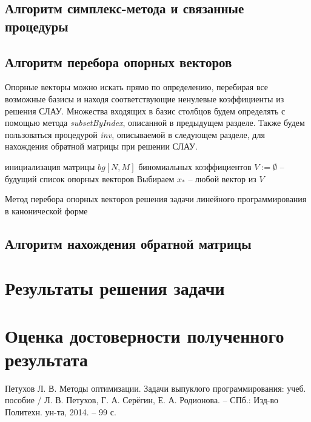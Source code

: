 \documentclass[main.tex]{subfiles}
\begin{document}
\subsection{Алгоритм симплекс-метода и связанные процедуры}

\subsection{Алгоритм перебора опорных векторов}
Опорные векторы можно искать прямо по определению, перебирая все возможные базисы и находя соответствующие ненулевые коэффициенты из решения СЛАУ. Множества входящих в базис столбцов будем определять с помощью метода \textit{subsetByIndex}, описанной в предыдущем разделе. Также будем пользоваться процедурой \textit{inv}, описываемой в следующем разделе, для нахождения обратной матрицы при решении СЛАУ.\\

\begin{algorithm}[H]
	инициализация матрицы $bg[N,M]$ биномиальных коэффициентов\;
	$V:=\emptyset$ -- будущий список опорных векторов\;
	Выбираем $x_*$  -- любой вектор из $V$\;
	
	\caption{Метод перебора опорных векторов решения задачи линейного программирования в канонической форме}
\end{algorithm}

\subsection {Алгоритм нахождения обратной матрицы}
\section{Результаты решения задачи}
\section{Оценка достоверности полученного результата}

\begin{thebibliography}{99}
	 Петухов Л. В. Методы оптимизации. Задачи выпуклого программирования: учеб. пособие / Л. В. Петухов, Г. А. Серёгин, Е. А. Родионова. -- СПб.: Изд-во Политехн. ун-та, 2014. -- 99 с.
\end{thebibliography}
\end{document}
